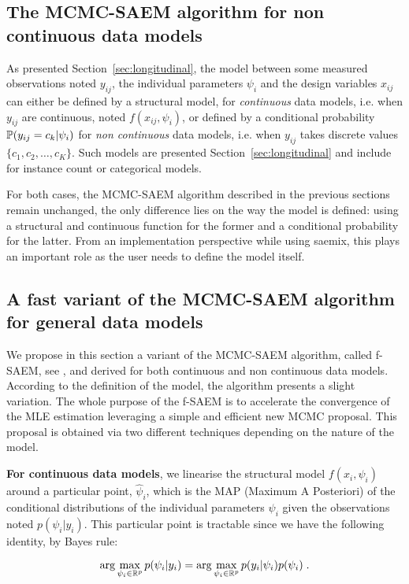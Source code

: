 \subsection{The MCMC-SAEM algorithm for non continuous data models}

As presented Section~\ref{sec:longitudinal}, the model between some measured observations noted $y_{ij}$, the individual parameters $\psi_i$ and the design variables $x_{ij}$ can either be defined by a structural model, for \emph{continuous} data models, i.e. when $y_{ij}$ are continuous, noted $f(x_{ij}, \psi_i)$, or defined by a conditional probability $\mathbb{P}(y_{ij}=c_k|\psi_i)$ for \emph{non continuous} data models, i.e. when $y_{ij}$ takes discrete values $\{c_1, c_2,\ldots , c_K\}$. Such models are presented Section~\ref{sec:longitudinal} and include for instance count or categorical models.

For both cases, the MCMC-SAEM algorithm described in the previous sections remain unchanged, the only difference lies on the way the model is defined: using a structural and continuous function for the former and a conditional probability for the latter. From an implementation perspective while using saemix, this plays an important role as the user needs to define the model itself.

\subsection{A fast variant of the MCMC-SAEM algorithm for general data models}\label{subsec:fsaem}

We propose in this section a variant of the MCMC-SAEM algorithm, called f-SAEM, see \cite{Karimi19}, and derived for both continuous and non continuous data models.
According to the definition of the model, the algorithm presents a slight variation.
The whole purpose of the f-SAEM is to accelerate the convergence of the MLE estimation leveraging a simple and efficient new MCMC proposal.
This proposal is obtained via two different techniques depending on the nature of the model.

\textbf{For continuous data models}, we linearise the structural model $f(x_{i}, \psi_i)$ around a particular point, $\hat{\psi}_i$, which is the MAP (Maximum A Posteriori) of the conditional distributions of the individual parameters $\psi_i$ given the observations noted $p(\psi_i|y_i) $. This particular point is tractable since we have the following identity, by Bayes rule:

\begin{equation}
\arg \max \limits_{\psi_i \in \mathbb{R}^p} p(\psi_i|y_i) = \arg \max \limits_{\psi_i \in \mathbb{R}^p} p(y_i|\psi_i)p(\psi_i) \;.
\end{equation}

